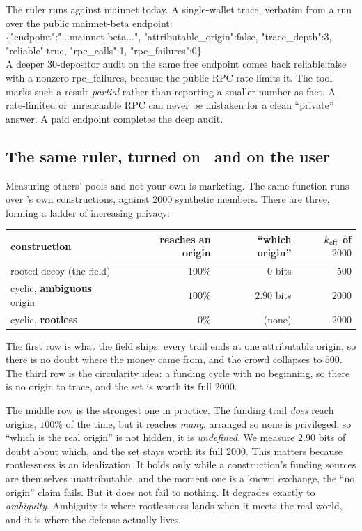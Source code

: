 \documentclass[11pt]{article}
\begin{document}
\begin{measured}
The ruler runs against mainnet today. A single-wallet trace, verbatim from a run over
the public mainnet-beta endpoint:\\[0.4em]
{\ttfamily\footnotesize \{"endpoint":"...mainnet-beta...", "attributable\_origin":false,
"trace\_depth":3, "reliable":true, "rpc\_calls":1, "rpc\_failures":0\}}\\[0.4em]
A deeper $30$-depositor audit on the same free endpoint comes back
{\ttfamily reliable:false} with a nonzero {\ttfamily rpc\_failures}, because the public
RPC rate-limits it. The tool marks such a result \emph{partial} rather than reporting a
smaller number as fact. A rate-limited or unreachable RPC can never be mistaken for a
clean ``private'' answer. A paid endpoint completes the deep audit.
\end{measured}

\subsection{The same ruler, turned on \river\ and on the user}

Measuring others' pools and not your own is marketing. The same function runs over
\river's own constructions, against $2000$ synthetic members. There are three, forming a
ladder of increasing privacy:

\begin{center}\small
\begin{tabular}{lrrr}
\toprule
construction & reaches an origin & ``which origin'' & $k_{\mathrm{eff}}$ of $2000$ \\
\midrule
rooted decoy (the field) & $100\%$ & $0$ bits & $500$ \\
cyclic, \textbf{ambiguous} origin & $100\%$ & $\mathbf{2.90}$ bits & $2000$ \\
cyclic, \textbf{rootless} & $0\%$ & (none) & $2000$ \\
\bottomrule
\end{tabular}
\end{center}

The first row is what the field ships: every trail ends at one attributable origin, so
there is no doubt where the money came from, and the crowd collapses to $500$. The third
row is the circularity idea: a funding cycle with no beginning, so there is no origin to
trace, and the set is worth its full $2000$.

The middle row is the strongest one in practice. The funding trail \emph{does} reach
origins, $100\%$ of the time, but it reaches \emph{many}, arranged so none is
privileged, so ``which is the real origin'' is not hidden, it is \emph{undefined}. We
measure $2.90$ bits of doubt about which, and the set stays worth its full $2000$. This
matters because rootlessness is an idealization. It holds only while a construction's
funding sources are themselves unattributable, and the moment one is a known exchange,
the ``no origin'' claim fails. But it does not fail to nothing. It degrades exactly to
\emph{ambiguity}. Ambiguity is where rootlessness lands when it meets the real world,
and it is where the defense actually lives.
\end{document}
